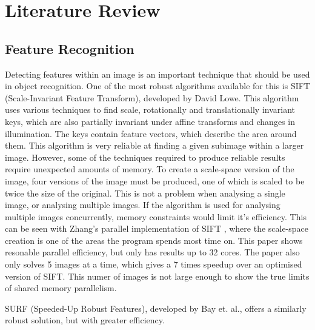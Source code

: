 \documentclass[../main.tex]{subfiles}
\begin{document}
  \section{Literature Review}
    \subsection{Feature Recognition}
      Detecting features within an image is an important technique that should be used in object recognition.
      One of the most robust algorithms available for this is SIFT (Scale-Invariant Feature Transform), developed by David Lowe\cite{sift}.
      This algorithm uses various techniques to find scale, rotationally and translationally invariant keys, which are also partially invariant under affine transforms and changes in illumination.
      The keys contain feature vectors, which describe the area around them.
      This algorithm is very reliable at finding a given subimage within a larger image.
      However, some of the techniques required to produce reliable results require unexpected amounts of memory.
      To create a scale-space version of the image, four versions of the image must be produced, one of which is scaled to be twice the size of the original.
      This is not a problem when analysing a single image, or analysing multiple images.
      If the algorithm is used for analysing multiple images concurrently, memory constraints would limit it's efficiency.
      This can be seen with Zhang's parallel implementation of SIFT \cite{zhangsift}, where the scale-space creation is one of the areas the program spends most time on.
      This paper shows resonable parallel efficiency, but only has results up to 32 cores.
      The paper also only solves 5 images at a time, which gives a 7 times speedup over an optimised version of SIFT.
      This numer of images is not large enough to show the true limits of shared memory parallelism.

      SURF (Speeded-Up Robust Features), developed by Bay et. al.\cite{surf}, offers a similarly robust solution, but with greater efficiency.
    \biblio
\end{document}
